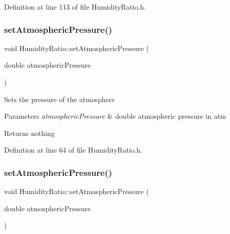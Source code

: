 Definition at line 113 of file Humidity\+Ratio.\+h.

\mbox{\label{class_humidity_ratio_aebab92be0c5eb4f23baaeb7268dad87e}} 
\subsubsection{\texorpdfstring{set\+Atmospheric\+Pressure()}{setAtmosphericPressure()}\hspace{0.1cm}{\footnotesize\ttfamily [1/3]}}
{\footnotesize\ttfamily void Humidity\+Ratio\+::set\+Atmospheric\+Pressure (\begin{DoxyParamCaption}\item[{double}]{atmospheric\+Pressure }\end{DoxyParamCaption})\hspace{0.3cm}{\ttfamily [inline]}}

Sets the pressure of the atmosphere


\begin{DoxyParams}{Parameters}
{\em atmospheric\+Pressure} & double atmospheric pressure in atm\\
\hline
\end{DoxyParams}
\begin{DoxyReturn}{Returns}
nothing 
\end{DoxyReturn}


Definition at line 64 of file Humidity\+Ratio.\+h.

\mbox{\label{class_humidity_ratio_aebab92be0c5eb4f23baaeb7268dad87e}} 
\subsubsection{\texorpdfstring{set\+Atmospheric\+Pressure()}{setAtmosphericPressure()}\hspace{0.1cm}{\footnotesize\ttfamily [2/3]}}
{\footnotesize\ttfamily void Humidity\+Ratio\+::set\+Atmospheric\+Pressure (\begin{DoxyParamCaption}\item[{double}]{atmospheric\+Pressure }\end{DoxyParamCaption})\hspace{0.3cm}{\ttfamily [inline]}}

